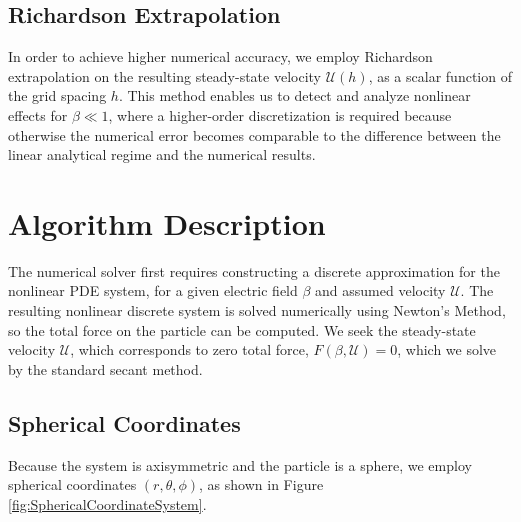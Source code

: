 \documentclass[MSc,beforeExam]{iitcsthesis}
\newcommand\cU{\mathscr{U}}
\begin{document}
\subsection{Richardson Extrapolation}
In order to achieve higher numerical accuracy, we employ Richardson extrapolation \cite{sidi2003practical}
on the resulting steady-state velocity $\cU(h)$, as a scalar function of the grid spacing $h$.
This method enables us to detect and analyze nonlinear effects for $\beta \ll 1$, where 
a higher-order discretization is required because otherwise
the numerical error becomes comparable to the difference between the linear analytical regime 
and the numerical results.

\section{Algorithm Description} \label{sec:algorithm}
The numerical solver first requires constructing a discrete 
approximation for the nonlinear PDE system,
for a given electric field $\beta$ and assumed velocity $\cU$. 
The resulting nonlinear discrete system is
solved numerically using Newton's Method, so the total force on the
particle can be computed. 
We seek the steady-state velocity $\cU$, 
which corresponds to zero total force, $F(\beta, \cU) = 0$,
which we solve by the standard secant method.

\subsection{Spherical Coordinates}
Because the system is axisymmetric and the particle is a sphere, we employ
spherical coordinates $(r,\theta,\phi)$, as shown in Figure \ref{fig:SphericalCoordinateSystem}.
\end{document}
